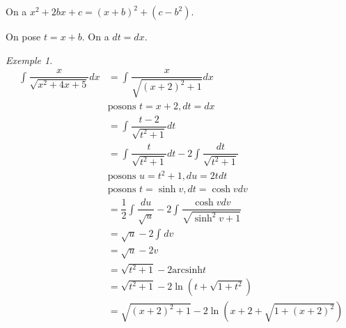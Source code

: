 \documentclass{report}
\newcommand*{\dint}[3]{\displaystyle\int_{#1}^{#2}#3}
\theoremstyle{definition}
\theoremstyle{remark}
\newtheorem*{exem}{Exemple}
\begin{document}
\begin{enumerate}
		On a $x^2+2bx+c = (x+b)^2+(c-b^2)$.

		On pose $t = x+b$. On a $dt = dx$.
		\begin{exem}
			\begin{align*}
				\dint{}{}{\dfrac{x}{\sqrt{x^2+4x+5}} dx}&= \dint{}{}{\dfrac{x}{\sqrt{(x+2)^2+1}} dx}\\
				&\text{posons }t=x+2, dt=dx\\
				&= \dint{}{}{\dfrac{t-2}{\sqrt{t^2+1}} dt}\\
				&= \dint{}{}{\dfrac{t}{\sqrt{t^2+1}} dt} - 2\dint{}{}{\dfrac{dt}{\sqrt{t^2+1}}}\\
				&\text{posons }u=t^2+1, du=2tdt\\
				&\text{posons }t=\sinh v, dt = \cosh v dv\\
				&= \dfrac{1}{2}\dint{}{}{\dfrac{du}{\sqrt{u}}} - 2\dint{}{}{\dfrac{\cosh v dv}{\sqrt{\sinh^2v+1}}}\\
				&= \sqrt{u} - 2\dint{}{}{dv}\\
				&= \sqrt{u} - 2v\\
				&= \sqrt{t^2+1} - 2 \mathrm{arcsinh}t\\
				&= \sqrt{t^2+1} - 2\ln(t+\sqrt{1+t^2})\\
				&= \sqrt{(x+2)^2+1} - 2\ln\left( x+2+\sqrt{1+(x+2)^2} \right)
			\end{align*}
		\end{exem}
	\end{enumerate}
\end{document}
